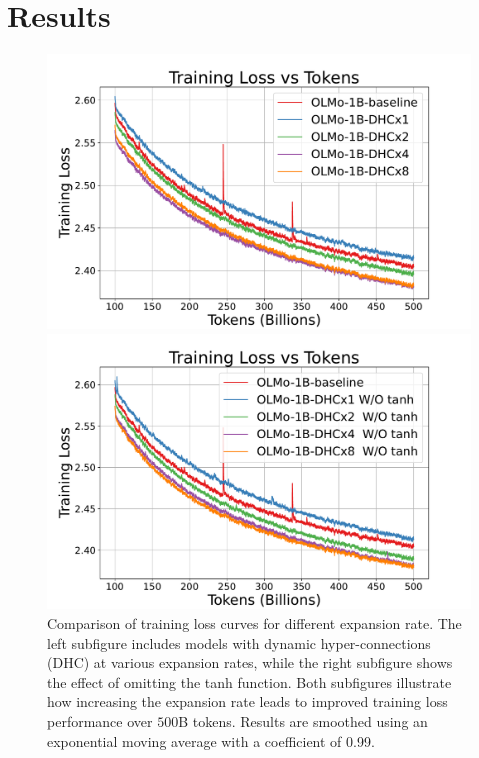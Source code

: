 \documentclass{article} %
\begin{document}
\section{Results}
\begin{figure}[h]
    \centering
    \begin{minipage}{0.45\textwidth}
        \centering
        \includegraphics[width=\linewidth]{fig/train_loss_1b_tanh_exp_099.pdf}
        
    \end{minipage}\hfill
    \begin{minipage}{0.45\textwidth}
        \centering
        \includegraphics[width=\linewidth]{fig/train_loss_1b_linear_exp_099.pdf}
    \end{minipage}
    \caption{Comparison of training loss curves for different expansion rate. The left subfigure includes models with dynamic hyper-connections (DHC) at various expansion rates, while the right subfigure shows the effect of omitting the tanh function. Both subfigures illustrate how increasing the expansion rate leads to improved training loss performance over $500$B tokens. Results are smoothed using an exponential moving average with a coefficient of 0.99.}
    \label{fig:1b_500B_training_loss}
\end{figure}
\end{document}
